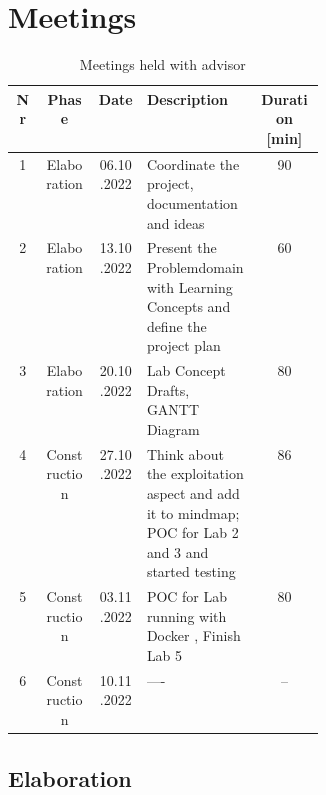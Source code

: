 \chapter{Meetings}
\label{meeting_chapter}

\begin{table}[H]
    \centering
    \begin{tabular}{| c | c | c | p{0.36\linewidth} | c |}
        \hline 
        Nr & Phase & Date & Description & Duration [min]\\
        \hline \hline
        1 & Elaboration & 06.10.2022 & Coordinate the project, documentation \- and ideas & 90\\
        \hline
        2 & Elaboration & 13.10.2022 & Present the Problemdomain with Learning Concepts and define the project plan & 60 \\
        \hline
        3 & Elaboration & 20.10.2022 & Lab Concept Drafts, GANTT Diagram & 80 \\
        \hline
        4 & Construction & 27.10.2022 & Think about the exploitation aspect and add it to mindmap; POC for Lab 2 and 3 and started testing & 86\\
        \hline
        5 & Construction & 03.11.2022 & POC for Lab running with Docker , Finish Lab 5 & 80 \\
        \hline
        6 & Construction & 10.11.2022 & ---- & --\\
        \hline
    \end{tabular}
    \caption{Meetings held with advisor}
    \label{meetings_hold_table}
\end{table}
\section{Elaboration}
